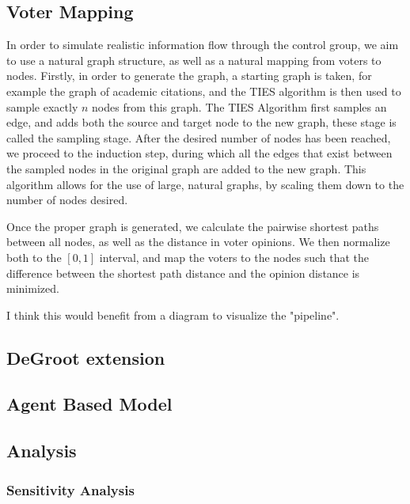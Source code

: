 \subsection{Voter Mapping}
In order to simulate realistic information flow through the control group, we aim to use a natural graph structure, as well as a natural mapping from voters to nodes. Firstly, in order to generate the graph, a starting graph is taken, for example the graph of academic citations, and the TIES \cite{ahmedNetworkSamplingStatic2013} algorithm is then used to sample exactly $n$ nodes from this graph. The TIES Algorithm first samples an edge, and adds both the source and target node to the new graph, these stage is called the sampling stage. After the desired number of nodes has been reached, we proceed to the induction step, during which all the edges that exist between the sampled nodes in the original graph are added to the new graph. This algorithm allows for the use of large, natural graphs, by scaling them down to the number of nodes desired.

Once the proper graph is generated, we calculate the pairwise shortest paths between all nodes, as well as the distance in voter opinions. We then normalize both to the $[0,1]$ interval, and map the voters to the nodes such that the difference between the shortest path distance and the opinion distance is minimized.

\textcolor{Bittersweet}{I think this would benefit from a diagram to visualize the "pipeline"}.

\subsection{DeGroot extension}
\subsection{Agent Based Model}
\subsection{Analysis}
\subsubsection{Sensitivity Analysis}

